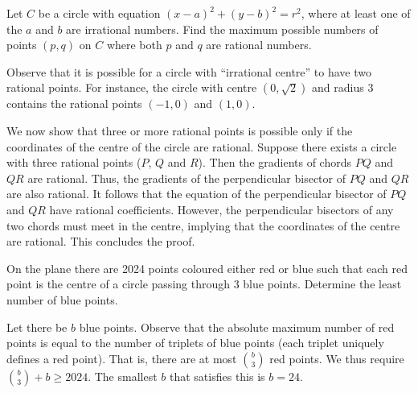 \begin{question}[2]\label{A::2024-O-1-21}
    Let $C$ be a circle with equation $(x-a)^2 + (y-b)^2 = r^2$, where at least one of the $a$ and $b$ are irrational numbers. Find the maximum possible numbers of points $(p,q)$ on $C$ where both $p$ and $q$ are rational numbers.
\end{question}
\begin{solution*}
    Observe that it is possible for a circle with ``irrational centre'' to have two rational points. For instance, the circle with centre $(0, \sqrt2)$ and radius 3 contains the rational points $(-1, 0)$ and $(1, 0)$. 

    We now show that three or more rational points is possible only if the coordinates of the centre of the circle are rational. Suppose there exists a circle with three rational points ($P$, $Q$ and $R$). Then the gradients of chords $PQ$ and $QR$ are rational. Thus, the gradients of the perpendicular bisector of $PQ$ and $QR$ are also rational. It follows that the equation of the perpendicular bisector of $PQ$ and $QR$ have rational coefficients. However, the perpendicular bisectors of any two chords must meet in the centre, implying that the coordinates of the centre are rational. This concludes the proof.
\end{solution*}

\begin{question}[24]\label{A::2024-O-1-22}
    On the plane there are 2024 points coloured either red or blue such that each red point is the centre of a circle passing through 3 blue points. Determine the least number of blue points.
\end{question}
\begin{solution*}
    Let there be $b$ blue points. Observe that the absolute maximum number of red points is equal to the number of triplets of blue points (each triplet uniquely defines a red point). That is, there are at most $\binom{b}{3}$ red points. We thus require $\binom{b}{3} + b \geq 2024$. The smallest $b$ that satisfies this is $b = 24$.
\end{solution*}

